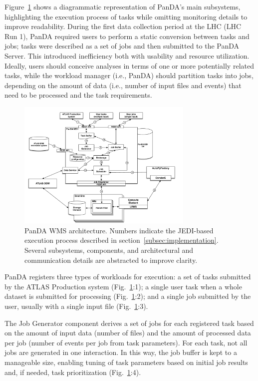Figure~\ref{fig:architecture} shows a diagrammatic representation of PanDA's
main subsystems, highlighting the execution process of tasks while omitting
monitoring details to improve readability. During the first data collection
period at the LHC (LHC Run 1), PanDA required users to perform a static
conversion between tasks and jobs; tasks were described as a set of jobs and
then submitted to the PanDA Server. This introduced inefficiency both with
usability and resource utilization. Ideally, users should conceive analyses in
terms of one or more potentially related tasks, while the workload manager
(i.e., PanDA) should partition tasks into jobs, depending on the amount of data
(i.e., number of input files and events) that need to be processed and the task
requirements.

\begin{figure}
  \includegraphics[width=0.75\textwidth]{images/PanDA_WMS.pdf}
  \caption{PanDA WMS architecture. Numbers indicate the JEDI-based execution
           process described in section~\ref{subsec:implementation}. Several
           subsystems, components, and architectural and communication details
           are abstracted to improve clarity.}
  \label{fig:architecture}
\end{figure}

PanDA registers three types of workloads for execution: a set of tasks
submitted by the ATLAS Production system (Fig.~\ref{fig:architecture}:1); a
single user task when a whole dataset is submitted for processing
(Fig.~\ref{fig:architecture}:2); and a single job submitted by the user,
usually with a single input file (Fig.~\ref{fig:architecture}:3).

The Job Generator component derives a set of jobs for each registered task
based on the amount of input data (number of files) and the amount of processed
data per job (number of events per job from task parameters). For each task,
not all jobs are generated in one interaction. In this way, the job buffer is
kept to a manageable size, enabling tuning of task parameters based on initial
job results and, if needed, task prioritization
(Fig.~\ref{fig:architecture}:4).

